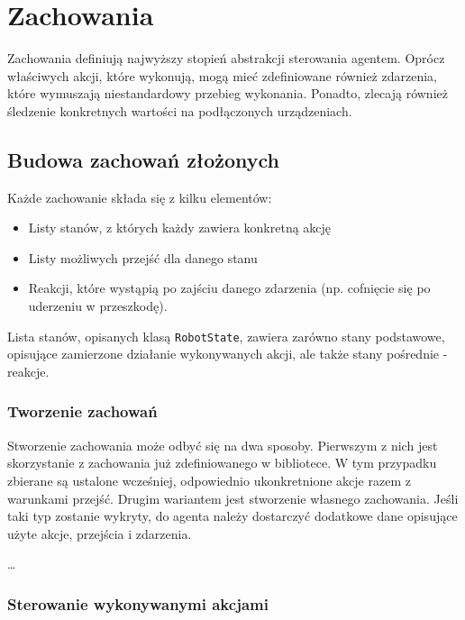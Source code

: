 \chapter{Zachowania}
\label{ch:zachowania}

Zachowania definiują najwyższy stopień abstrakcji sterowania agentem. Oprócz właściwych akcji, które wykonują, mogą mieć zdefiniowane również zdarzenia, które wymuszają niestandardowy przebieg wykonania. Ponadto, zlecają również śledzenie konkretnych wartości na podłączonych urządzeniach.

\section{Budowa zachowań złożonych}

Każde zachowanie składa się z kilku elementów:
\begin{itemize}
    \item Listy stanów, z których każdy zawiera konkretną akcję
    \item Listy możliwych przejść dla danego stanu
    \item Reakcji, które wystąpią po zajściu danego zdarzenia (np. cofnięcie się po uderzeniu w przeszkodę).
\end{itemize}

Lista stanów, opisanych klasą {\tt RobotState}, zawiera zarówno stany podstawowe, opisujące zamierzone działanie wykonywanych akcji, ale także stany pośrednie - reakcje.

\subsection{Tworzenie zachowań}

Stworzenie zachowania może odbyć się na dwa sposoby. Pierwszym z nich jest skorzystanie z zachowania już zdefiniowanego w bibliotece. W tym przypadku zbierane są ustalone wcześniej, odpowiednio ukonkretnione akcje razem z warunkami przejść. Drugim wariantem jest stworzenie własnego zachowania. Jeśli taki typ zostanie wykryty, do agenta należy dostarczyć dodatkowe dane opisujące użyte akcje, przejścia i zdarzenia.

\ldots


\subsection{Sterowanie wykonywanymi akcjami}

